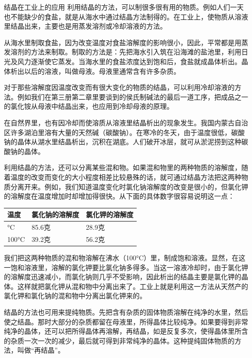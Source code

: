 结晶在工业上的应用
利用结晶的方法，可以制很多很有用的物质。例如人们一天也不能缺少的食盐，就是从海水中通过结晶方法制得的。在工业上，使物质从溶液里结晶出来，主要也是用蒸发溶剂或冷却溶液的方法。

从海水里制取食盐，因为改变温度对食盐溶解度的影响很小，因此，平常都是用蒸发溶剂的方法来制取。制取的方法是：先把海水引入筑在沿海滩的盐池里，利用日光及风力逐渐使它蒸发。当海水里的食盐浓度达到饱和后，食盐就成晶体析出。晶体析出以后的溶液，叫做母液。母液里通常含有许多杂质。

对于那些溶解度因温度改变而有很大变化的物质的结晶，可以利用冷却溶液的方法。例如我们在第三册第二章里要谈到的侯氏制碱法的最后一道工序，把成品之一的氯化铵从母液中结晶出来，也应用到冷却母液的原理。

在自然界里，也有因冷却而使溶质从溶液里结晶析出的现象发生。我国内蒙古自治区许多湖泊里溶有大量的天然碱（碳酸钠）。在寒冷的冬天，由于温度很低，碳酸钠的晶体从湖水里结晶析出，沉积在湖底。人们破开冰层，就可从淤泥捞到这种碳酸钠的晶体。

利用结晶的方法，还可以分离某些混和物。如果混和物里的两种物质的溶解度，随着温度的改变而变化的大小程度相差比较悬殊的话，就可通过结晶方法把这两种物质分离开来。例如，我们知道温度变化时氯化钠溶解度的改变是很小的，但氯化钾的溶解度在温度增加时却增加得很快。从下面的具体数字很容易说明这一点：

{\def\LTcaptype{none} %
\begin{longtable}[]{@{}lll@{}}
\toprule\noalign{}
温度 & 氯化钠的溶解度 & 氯化钾的溶解度 \\
\midrule\noalign{}
\endhead
\bottomrule\noalign{}
\endlastfoot
0°C & 85.6克 & 28.9克 \\
100°C & 39.2克 & 56.2克 \\
\end{longtable}
}

我们把这两种物质的混和物溶解在沸水（100°C）里，制成饱和溶液。显然，在这一饱和溶液里，溶解的氯化钾要比氯化钠多得多。当这一溶液冷却时，由于氯化钾的溶解度迅速减小，而氯化钠则几乎不受影响，因此析出的结晶主要是氯化钾的晶体。这样就把氯化钾从混和物中分离出来了。工业上就是利用这一方法从天然产的氯化钾和氯化钠的混和物中分离出氯化钾来的。

结晶的方法也可用来提纯物质。先把含有杂质的固体物质溶解在纯净的水里，然后使之结晶。那时大部分的杂质都留在母液里，所得晶体比较纯净。如果要得到非常纯净的晶体，还可以把所得晶体再溶解，再结晶，如是反复多次，使得晶体里所含的杂质一次一次的减少，最后就可得到非常纯净的晶体。这种提纯固体物质的方法，叫做``再结晶''。

